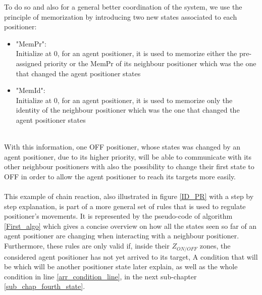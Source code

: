 \documentclass[]{spie}  %
\begin{document}
	To do so and also for a general better coordination of the system, we use the principle of memorization by introducing two new states associated to each positioner: 
	\begin{itemize}
		\item "MemPr":  \\
		Initialize at 0, for an agent positioner, it is used to memorize either the pre-assigned priority or the MemPr of its neighbour positioner which was the one that changed the agent positioner states\\
		\item "MemId": \\
		Initialize at 0, for an agent positioner, it is used to memorize only the identity of the neighbour positioner which was the one that changed the agent positioner states
	\end{itemize}\\
	  With this information, one OFF positioner, whose states was changed by an agent positioner, due to its higher priority, will be able to communicate with its other neighbour positioners with also the possibility to change their first state to OFF in order to allow the agent positioner to reach its targets more easily.\\ \\
	 This example of chain reaction, also illustrated in figure \ref{ID_PR} with a step by step explanation, is part of a more general set of rules that is used to regulate positioner's movements. It is represented by the pseudo-code of algorithm \ref{First_algo} which gives a concise overview on how all the states seen so far of an agent positioner are changing when interacting with a neighbour positioner.\\
	 Furthermore, these rules are only valid if, inside their $Z_{ON/OFF}$ zones, the considered agent positioner has not yet arrived to its target,  
	 A condition that will be which will be another positioner state later explain, as well as the whole condition in line \ref{arr_condition_line},  in the next sub-chapter \ref{sub_chap_fourth_state}.\\\\
\end{document}
